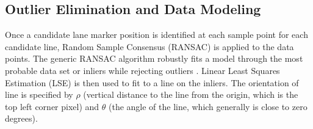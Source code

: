 \documentclass{article}
\begin{document}
\subsection{Outlier Elimination and Data Modeling}
Once a candidate lane marker position is identified at each sample point for each candidate line, Random Sample Consensus (RANSAC) is applied to the data points. The generic RANSAC algorithm robustly fits a model through the most probable data set or inliers while rejecting outliers \cite{hartley_multiple_2004,fischler_random_1981}. Linear Least Squares Estimation (LSE) is then used to fit to a line on the inliers.
The orientation of line is specified by $\rho$ (vertical distance to the line from the origin, which is the top left corner pixel) and $\theta$ (the angle of the line, which generally is close to zero degrees).
\end{document}
